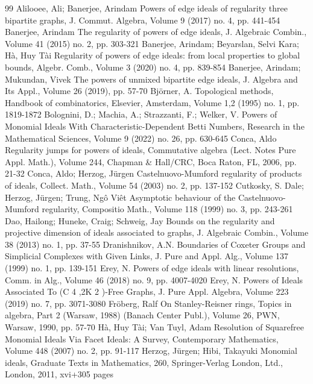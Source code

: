 \documentclass[10pt]{article}
\theoremstyle{definition}
\numberwithin{equation}{section}
\begin{document}
\begin{thebibliography}{99}
Alilooee, Ali; Banerjee, Arindam Powers of edge ideals of regularity three bipartite graphs, J. Commut. Algebra, Volume 9 (2017) no. 4, pp. 441-454
Banerjee, Arindam The regularity of powers of edge ideals, J. Algebraic Combin., Volume 41 (2015) no. 2, pp. 303-321
Banerjee, Arindam; Beyarslan, Selvi Kara; Hà, Huy Tài Regularity of powers of edge ideals: from local properties to global bounds, Algebr. Comb., Volume 3 (2020) no. 4, pp. 839-854
Banerjee, Arindam; Mukundan, Vivek The powers of unmixed bipartite edge ideals, J. Algebra and Its Appl., Volume 26 (2019), pp. 57-70
Björner, A. Topological methods, Handbook of combinatorics, Elsevier, Amsterdam, Volume 1,2 (1995) no. 1, pp. 1819-1872
Bolognini, D.; Machia, A.; Strazzanti, F.; Welker, V. Powers of Monomial Ideals With Characteristic-Dependent Betti Numbers, Research in the Mathematical Sciences, Volume 9 (2022) no. 26, pp. 630-645
Conca, Aldo Regularity jumps for powers of ideals, Commutative algebra (Lect. Notes Pure Appl. Math.), Volume 244, Chapman \& Hall/CRC, Boca Raton, FL, 2006, pp. 21-32
Conca, Aldo; Herzog, Jürgen Castelnuovo-Mumford regularity of products of ideals, Collect. Math., Volume 54 (2003) no. 2, pp. 137-152
Cutkosky, S. Dale; Herzog, Jürgen; Trung, Ngô Viêt Asymptotic behaviour of the Castelnuovo-Mumford regularity, Compositio Math., Volume 118 (1999) no. 3, pp. 243-261
Dao, Hailong; Huneke, Craig; Schweig, Jay Bounds on the regularity and projective dimension of ideals associated to graphs, J. Algebraic Combin., Volume 38 (2013) no. 1, pp. 37-55
Dranishnikov, A.N. Boundaries of Coxeter Groups and Simplicial Complexes with Given Links, J. Pure and Appl. Alg., Volume 137 (1999) no. 1, pp. 139-151
Erey, N. Powers of edge ideals with linear resolutions, Comm. in Alg., Volume 46 (2018) no. 9, pp. 4007-4020
Erey, N. Powers of Ideals Associated To (C 4 ,2K 2 )-Free Graphs, J. Pure Appl. Algebra, Volume 223 (2019) no. 7, pp. 3071-3080
Fröberg, Ralf On Stanley-Reisner rings, Topics in algebra, Part 2 (Warsaw, 1988) (Banach Center Publ.), Volume 26, PWN, Warsaw, 1990, pp. 57-70
Hà, Huy Tài; Van Tuyl, Adam Resolution of Squarefree Monomial Ideals Via Facet Ideals: A Survey, Contemporary Mathematics, Volume 448 (2007) no. 2, pp. 91-117
Herzog, Jürgen; Hibi, Takayuki Monomial ideals, Graduate Texts in Mathematics, 260, Springer-Verlag London, Ltd., London, 2011, xvi+305 pages

\end{thebibliography}
\end{document}
